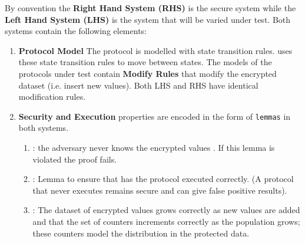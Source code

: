 \documentclass[journal]{IEEEtran}
\begin{document}
 By convention the \textbf{Right Hand System (RHS)} is the secure system while the \textbf{Left Hand System (LHS)} is the system that will be varied under test. Both systems contain the following elements:
\begin{enumerate}[label=(\Alph*)]
\item \textbf{Protocol Model} The protocol is modelled with \tamarin{} state transition rules. \tamarin{} uses these state transition rules to move between states. The models of the protocols under test contain \textbf{Modify Rules} that modify the encrypted dataset (i.e. insert new values). Both LHS and RHS have identical modification rules.
\item \textbf{Security and Execution} properties are encoded in the form of \texttt{lemmas} in both systems. 
\begin{enumerate}
	\item {}: the adversary never knows the encrypted values \enc{}. If this lemma is violated the proof fails.
    \item {}: Lemma to ensure that has the protocol executed correctly. (A protocol that never executes remains secure and can give false positive results).
	\item {}: The dataset of encrypted values \enc{} grows correctly as new values are added and that the set of counters increments correctly as the population grows; these counters model the distribution in the protected data.
\end{enumerate}


\end{enumerate}
\end{document}
